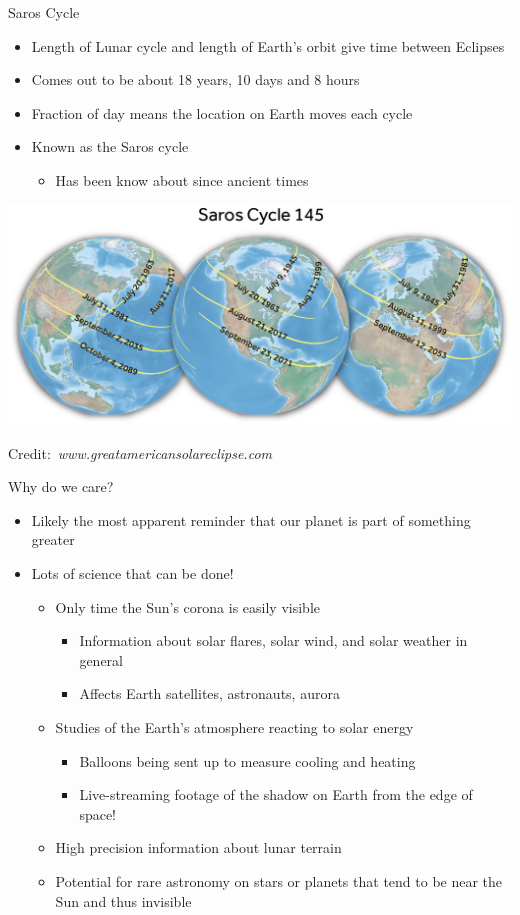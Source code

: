 \documentclass[pdf, aspectratio=169]{beamer}
\newcommand{\credit}[1]{\par\hfill\tiny Credit:~\itshape#1\hspace*{.7cm}}
\begin{document}
\begin{frame}{Saros Cycle}
	\begin{itemize}
		\item Length of Lunar cycle and length of Earth's orbit give time between Eclipses
		\item Comes out to be about 18 years, 10 days and 8 hours
		\item Fraction of day means the location on Earth moves each cycle
		\item Known as the Saros cycle
			\begin{itemize}
				\item Has been know about since ancient times
			\end{itemize}
			
	\end{itemize}
	\begin{center}
		\includegraphics[width=.7\textwidth]{saros.png}
		\credit{www.greatamericansolareclipse.com}
	\end{center}
\end{frame}

\begin{frame}{Why do we care?}
	\begin{itemize}
		\item Likely the most apparent reminder that our planet is part of something greater
		\item Lots of science that can be done!
			\begin{itemize}
				\item Only time the Sun's corona is easily visible
					\begin{itemize}
						\item Information about solar flares, solar wind, and solar weather in general
						\item Affects Earth satellites, astronauts, aurora
					\end{itemize}
				\item Studies of the Earth's atmosphere reacting to solar energy
					\begin{itemize}
						\item Balloons being sent up to measure cooling and heating
						\item Live-streaming footage of the shadow on Earth from the edge of space!
					\end{itemize}
				\item High precision information about lunar terrain
				\item Potential for rare astronomy on stars or planets that tend to be near the Sun and thus invisible
			\end{itemize}
	\end{itemize}
\end{frame}
\end{document}
